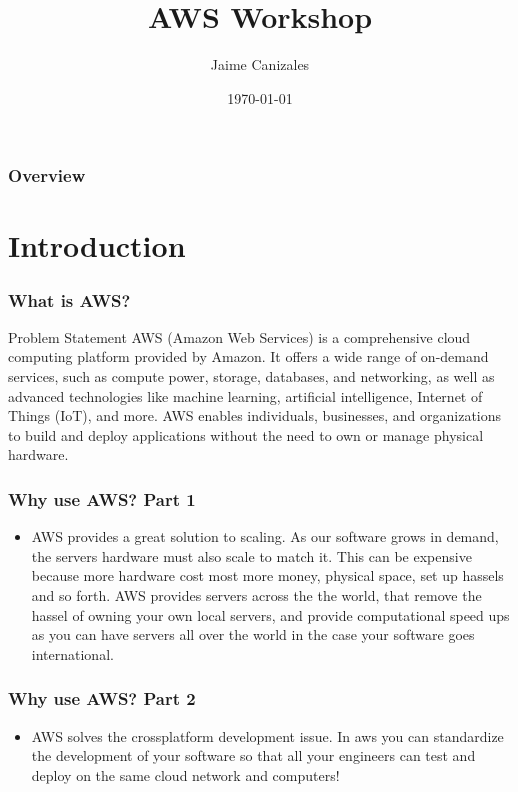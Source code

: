 \documentclass{beamer}
\title[AWS Workshop]{AWS Workshop}
\author{Jaime Canizales}
\institute[Hunter College] 
{
City University of New York \\ 
\medskip
\textit{jaime.canizales@hunter.cuny.edu} 
}
\date{\today}
\begin{document}
\begin{frame}
\titlepage 
\end{frame}


\begin{frame} \frametitle{Overview} 
\tableofcontents
\end{frame}


\section{Introduction}
\begin{frame}\frametitle{What is AWS?}
\begin{block}{Problem Statement}
AWS (Amazon Web Services) is a comprehensive cloud computing platform 
provided by Amazon. It offers a wide range of on-demand services, such as 
compute power, storage, databases, and networking, as well as advanced 
technologies like machine learning, artificial intelligence, Internet of Things (IoT),
and more. AWS enables individuals, businesses, and organizations to build and deploy 
applications without the need to own or manage physical hardware.
\end{block}
\end{frame}


\begin{frame}\frametitle{Why use AWS? Part 1}
\begin{itemize}
\item AWS provides a great solution to scaling. As our software grows in demand, 
the servers hardware must also scale to match it. This can be expensive because
more hardware cost most more money, physical space, set up hassels and so forth. 
AWS provides servers across the the world, that remove the hassel of owning 
your own local servers, and provide computational speed ups as you can have 
servers all over the world in the case your software goes international.    
\end{itemize}
\end{frame}


\begin{frame}\frametitle{Why use AWS? Part 2}
\begin{itemize}
\item AWS solves the crossplatform development issue. In aws you can standardize
the development of your software so that all your engineers can test and 
deploy on the same cloud network and computers!   
\end{itemize}
\end{frame}
\end{document}
